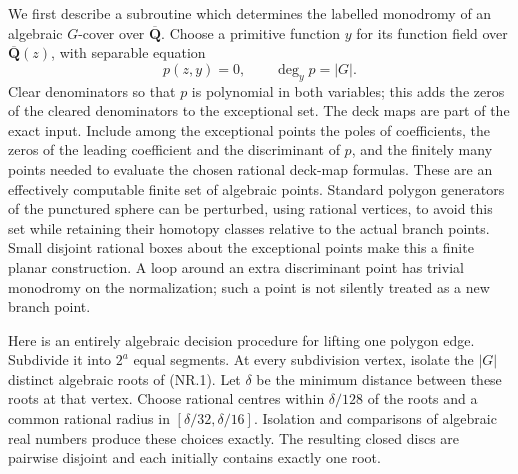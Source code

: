 We first describe a subroutine which determines the labelled monodromy of
an algebraic $G$-cover over $\overline{\mathbf Q}$.  Choose a primitive
function $y$ for its function field over $\overline{\mathbf Q}(z)$, with
separable equation
\[
                 p(z,y)=0,\qquad \deg_y p=|G|.                 \tag{NR.1}
\]
Clear denominators so that $p$ is polynomial in both variables; this adds
the zeros of the cleared denominators to the exceptional set.
The deck maps are part of the exact input.  Include among the exceptional
points the poles of coefficients, the zeros of the leading coefficient and
the discriminant of $p$, and the finitely many points needed to evaluate
the chosen rational deck-map formulas.  These are an effectively computable
finite set of algebraic points.  Standard polygon generators of the
punctured sphere can be perturbed, using rational vertices, to avoid this
set while retaining their homotopy classes relative to the actual branch
points.  Small disjoint rational boxes about the exceptional points make
this a finite planar construction.  A loop around an extra discriminant
point has trivial monodromy on the normalization; such a point is not
silently treated as a new branch point.

Here is an entirely algebraic decision procedure for lifting one polygon
edge.  Subdivide it into $2^a$ equal segments.  At every subdivision vertex,
isolate the $|G|$ distinct algebraic roots of (NR.1).  Let $\delta$ be the
minimum distance between these roots at that vertex.  Choose rational
centres within $\delta/128$ of the roots and a common rational radius in
$[\delta/32,\delta/16]$.  Isolation and comparisons of algebraic real
numbers produce these choices exactly.  The resulting closed discs are
pairwise disjoint and each initially contains exactly one root.

